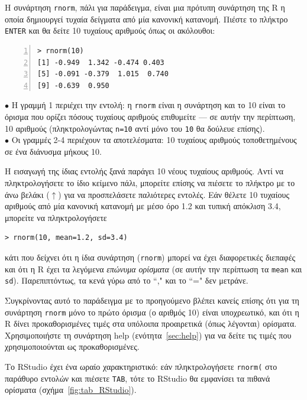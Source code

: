 \documentclass[a4paper,11pt,twocolumn,tablecaptionabove]{scrartcl}
\makeatletter
\let\SF@@footnote\footnote
\def\footnote{\ifx\protect\@typeset@protect
 \expandafter\SF@@footnote
 \else
 \expandafter\SF@gobble@opt
 \fi
}
\edef\SF@gobble@opt{\noexpand\protect
 \expandafter\noexpand\csname SF@gobble@opt \endcsname}
\makeatother
\begin{document}
Η συνάρτηση \texttt{rnorm}, πάλι για παράδειγμα, είναι μια πρότυπη συνάρτηση της R η οποία δημιουργεί
τυχαία δείγματα από μία κανονική κατανομή. Πιέστε το πλήκτρο \texttt{ENTER} και θα δείτε 10 τυχαίους αριθμούς
όπως οι ακόλουθοι:

\begin{Verbatim}[frame=single,numbers=left,gobble=0, xleftmargin=0.35cm, numbersep=0.1cm]
> rnorm(10)
[1] -0.949  1.342 -0.474 0.403 
[5] -0.091 -0.379  1.015  0.740 
[9] -0.639  0.950
\end{Verbatim}

\noindent $\bullet$ Η γραμμή 1 περιέχει την εντολή: η \texttt{rnorm} είναι η συνάρτηση και το 10 είναι το όρισμα
που ορίζει πόσους τυχαίους αριθμούς επιθυμείτε --- σε αυτήν την περίπτωση, 10 αριθμούς (πληκτρολογώντας
\texttt{n=10} αντί μόνο του \texttt{10} θα δούλευε επίσης).\\
\noindent $\bullet$ Οι γραμμές 2-4 περιέχουν τα αποτελέσματα: 10 τυχαίους αριθμούς τοποθετημένους σε ένα
διάνυσμα μήκους 10.

Η εισαγωγή της ίδιας εντολής ξανά παράγει 10 νέους τυχαίους αριθμούς. Αντί να πληκτρολογήσετε το ίδιο κείμενο 
πάλι, μπορείτε επίσης να πιέσετε το πλήκτρο με το άνω βελάκι ($\uparrow$) για να προσπελάσετε παλιότερες 
εντολές. Εάν θέλετε 10 τυχαίους αριθμούς από μία κανονική κατανομή με μέσο όρο 1.2 και τυπική απόκλιση 3.4,
μπορείτε να πληκτρολογήσετε
\begin{Verbatim}[frame=single,gobble=0]
> rnorm(10, mean=1.2, sd=3.4)
\end{Verbatim}
κάτι που δείχνει ότι η ίδια συνάρτηση (\texttt{rnorm}) μπορεί να έχει διαφορετικές διεπαφές και ότι η R έχει
τα λεγόμενα \emph{επώνυμα ορίσματα}  (σε αυτήν την περίπτωση τα \texttt{mean} και \texttt{sd}). Παρεπιπτόντως,
τα κενά γύρω από το ``," και το ``=" δεν μετράνε.

Συγκρίνοντας αυτό το παράδειγμα με το προηγούμενο βλέπει κανείς επίσης ότι για τη συνάρτηση \texttt{rnorm}
μόνο το πρώτο όρισμα (ο αριθμός 10) είναι υποχρεωτικό, και ότι η R δίνει προκαθορισμένες τιμές στα υπόλοιπα
προαιρετικά (όπως λέγονται) ορίσματα.\footnote{Χρησιμοποιήστε τη συνάρτηση help (ενότητα~\ref{sec:help}) για να
δείτε τις τιμές που χρησιμοποιούνται ως προκαθορισμένες.} 

Το RStudio έχει ένα ωραίο χαρακτηριστικό: εάν πληκτρολογήσετε \verb!rnorm(! στο παράθυρο εντολών και πιέσετε
\texttt{TAB}, τότε το RStudio θα εμφανίσει τα πιθανά ορίσματα (σχήμα~\ref{fig:tab_RStudio}).

\end{document}
